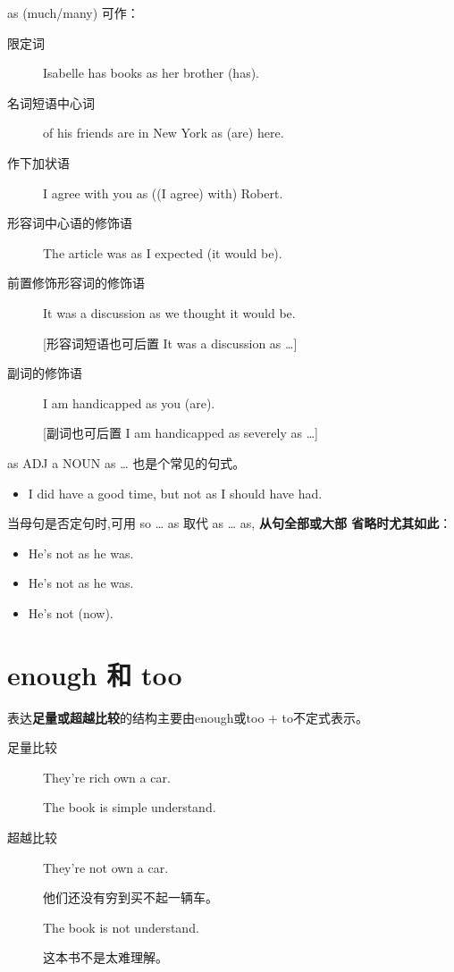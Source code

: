 as (much/many) 可作：
\begin{description}
\item[限定词] Isabelle has  books as her brother (has).

\item[名词短语中心词]  of his friends are in New York as (are) here.

\item[作下加状语] I agree with you  as ((I agree) with) Robert.

\item[形容词中心语的修饰语] The article was  as I expected (it
  would be).

\item[前置修饰形容词的修饰语] It was  a discussion as we thought it would be.

  [形容词短语也可后置 It was a discussion  as \ldots{}]

\item[副词的修饰语] I am  handicapped as you (are).

  [副词也可后置 I am handicapped as severely as \ldots{}]
\end{description}

as ADJ a NOUN as \ldots{} 也是个常见的句式。
\begin{itemize}
\item  I did have a good time, but not  as I should have had.
\end{itemize}

当母句是否定句时,可用 so \ldots{} as 取代 as \ldots{} as, \textbf{从句全部或大部
省略时尤其如此}：
\begin{itemize}
\item He's not  as he was.
\item He's not  as he was.
\item He's not  (now).
\end{itemize}

\section{enough 和 too}

表达\textbf{足量或超越比较}的结构主要由enough或too + to不定式表示。
\begin{description}
\item[足量比较] They're rich  own a car.

  The book is simple  understand.

\item[超越比较] They're not  own a car.

  他们还没有穷到买不起一辆车。

  The book is not  understand.

  这本书不是太难理解。
\end{description}

